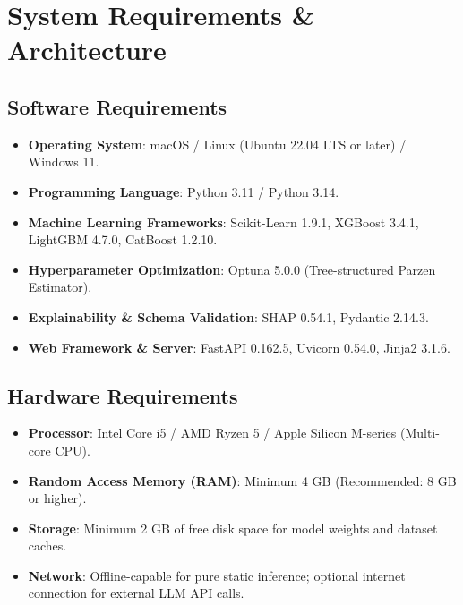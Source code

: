 \documentclass[12pt,a4paper,oneside]{report}
\begin{document}
\chapter{System Requirements \& Architecture}

\section{Software Requirements}
\begin{itemize}
    \item \textbf{Operating System}: macOS / Linux (Ubuntu 22.04 LTS or later) / Windows 11.
    \item \textbf{Programming Language}: Python 3.11 / Python 3.14.
    \item \textbf{Machine Learning Frameworks}: Scikit-Learn 1.9.1, XGBoost 3.4.1, LightGBM 4.7.0, CatBoost 1.2.10.
    \item \textbf{Hyperparameter Optimization}: Optuna 5.0.0 (Tree-structured Parzen Estimator).
    \item \textbf{Explainability \& Schema Validation}: SHAP 0.54.1, Pydantic 2.14.3.
    \item \textbf{Web Framework \& Server}: FastAPI 0.162.5, Uvicorn 0.54.0, Jinja2 3.1.6.
\end{itemize}

\section{Hardware Requirements}
\begin{itemize}
    \item \textbf{Processor}: Intel Core i5 / AMD Ryzen 5 / Apple Silicon M-series (Multi-core CPU).
    \item \textbf{Random Access Memory (RAM)}: Minimum 4 GB (Recommended: 8 GB or higher).
    \item \textbf{Storage}: Minimum 2 GB of free disk space for model weights and dataset caches.
    \item \textbf{Network}: Offline-capable for pure static inference; optional internet connection for external LLM API calls.
\end{itemize}
\end{document}
